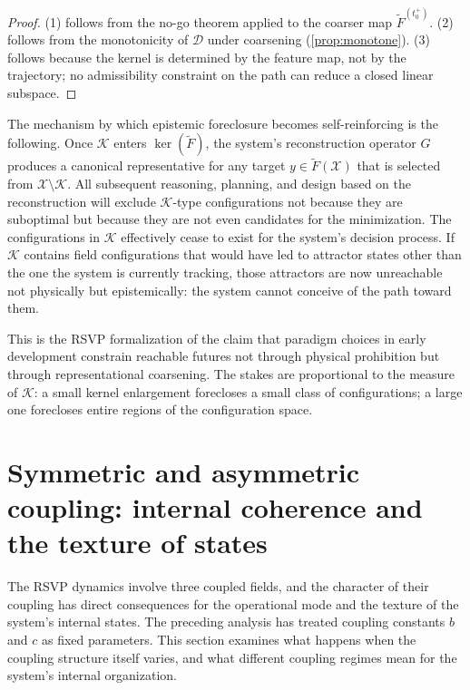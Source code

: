 \documentclass[12pt, oneside]{memoir}
\newcommand{\X}{\mathcal{X}}
\newcommand{\Ft}{\widetilde{F}}
\begin{document}
\begin{proof}
(1) follows from the no-go theorem applied to the coarser map $\Ft^{(t_0^+)}$.  (2)
follows from the monotonicity of $\mathcal{D}$ under coarsening (\cref{prop:monotone}).
(3) follows because the kernel is determined by the feature map, not by the trajectory;
no admissibility constraint on the path can reduce a closed linear subspace.
\end{proof}

The mechanism by which epistemic foreclosure becomes self-reinforcing is the following.
Once $\mathcal{K}$ enters $\ker(\Ft)$, the system's reconstruction operator $G$ produces
a canonical representative for any target $y \in \Ft(\X)$ that is selected from
$\X \setminus \mathcal{K}$.  All subsequent reasoning, planning, and design based on the
reconstruction will exclude $\mathcal{K}$-type configurations not because they are
suboptimal but because they are not even candidates for the minimization.  The
configurations in $\mathcal{K}$ effectively cease to exist for the system's decision
process.  If $\mathcal{K}$ contains field configurations that would have led to
attractor states other than the one the system is currently tracking, those attractors
are now unreachable not physically but epistemically: the system cannot conceive of the
path toward them.

This is the RSVP formalization of the claim that paradigm choices in early development
constrain reachable futures not through physical prohibition but through representational
coarsening.  The stakes are proportional to the measure of $\mathcal{K}$: a small
kernel enlargement forecloses a small class of configurations; a large one forecloses
entire regions of the configuration space.

\section{Symmetric and asymmetric coupling: internal coherence and the texture of states}
\label{sec:coupling-texture}

The RSVP dynamics involve three coupled fields, and the character of their coupling has
direct consequences for the operational mode and the texture of the system's internal
states.  The preceding analysis has treated coupling constants $b$ and $c$ as fixed
parameters.  This section examines what happens when the coupling structure itself
varies, and what different coupling regimes mean for the system's internal organization.
\end{document}

